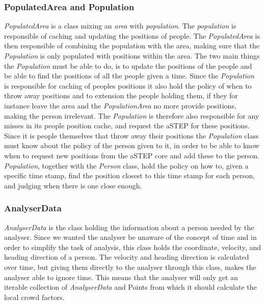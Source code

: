 \subsubsection{PopulatedArea and Population}
\emph{PopulatedArea} is a class mixing an \emph{area} with \emph{population}. The \emph{population} is responsible of caching and updating the positions of people. The \emph{PopulatedArea} is then responsible of combining the population with the area, making sure that the \emph{Population} is only populated with positions within the area. The two main things the \emph{Population} must be able to do, is to update the positions of the people and be able to find the positions of all the people given a time. Since the \emph{Population} is responsible for caching of peoples positions it also hold the policy of when to throw away positions and to extension the people holding them, if they for instance leave the area and the \emph{PopulationArea} no more provide positions, making the person irrelevant. The \emph{Population} is therefore also responsible for any misses in its people position cache, and request the aSTEP for these positions. Since it is people themselves that throw away their positions the \emph{Population} class must know about the policy of the person given to it, in order to be able to know when to request new positions from the aSTEP core and add these to the person. \emph{Population}, together with the \emph{Person} class, hold the policy on how to, given a specific time stamp, find the position closest to this time stamp for each person, and judging when there is one close enough.

\subsubsection{AnalyserData}
\emph{AnalyserData} is the class holding the information about a person needed by the analyser. Since we wanted the analyser be unaware of the concept of time and in order to simplify the task of analysis, this class holds the coordinate, velocity, and heading direction of a person. The velocity and heading direction is calculated over time, but giving them directly to the analyser through this class, makes the analyser able to ignore time. This means that the analyser will only get an iterable collection of \emph{AnalyserData} and Points from which it should calculate the local crowd factors. 

